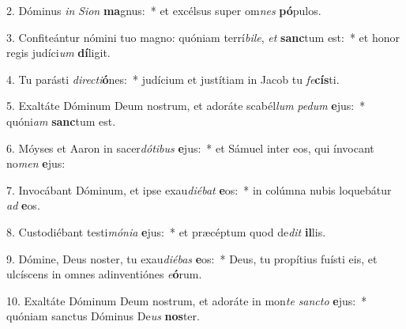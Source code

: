 2. Dóminus \textit{in} \textit{Si}\textit{on} \textbf{ma}gnus:~*  et excélsus super om\textit{nes} \textbf{pó}pulos.\

3. Confiteántur nómini tuo magno: quóniam terrí\textit{bi}\textit{le}, \textit{et} \textbf{sanc}tum est:~*  et honor regis judíci\textit{um} \textbf{dí}ligit.\

4. Tu parásti \textit{di}\textit{rec}\textit{ti}\textbf{ó}nes:~*  judícium et justítiam in Jacob tu \textit{fe}\textbf{cís}ti.\

5. Exaltáte Dóminum Deum nostrum, et adoráte scabél\textit{lum} \textit{pe}\textit{dum} \textbf{e}jus:~*  quóni\textit{am} \textbf{sanc}tum est.\

6. Móyses et Aaron in sacer\textit{dó}\textit{ti}\textit{bus} \textbf{e}jus:~*  et Sámuel inter eos, qui ínvocant no\textit{men} \textbf{e}jus:\

7. Invocábant Dóminum, et ipse exau\textit{di}\textit{é}\textit{bat} \textbf{e}os:~*  in colúmna nubis loquebátur \textit{ad} \textbf{e}os.\

8. Custodiébant testi\textit{mó}\textit{ni}\textit{a} \textbf{e}jus:~*  et præcéptum quod de\textit{dit} \textbf{il}lis.\

9. Dómine, Deus noster, tu exau\textit{di}\textit{é}\textit{bas} \textbf{e}os:~*  Deus, tu propítius fuísti eis, et ulcíscens in omnes adinventiónes \textit{e}\textbf{ó}rum.\

10. Exaltáte Dóminum Deum nostrum, et adoráte in mon\textit{te} \textit{sanc}\textit{to} \textbf{e}jus:~*  quóniam sanctus Dóminus De\textit{us} \textbf{nos}ter.\

